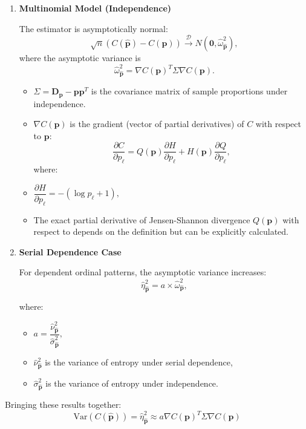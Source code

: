 \documentclass[12pt,a4paper]{article}
\begin{document}
\begin{enumerate}
	\item \textbf{Multinomial Model (Independence)}
	
	The estimator is asymptotically normal:
	$$ \sqrt{n}(C(\widehat{\mathbf{p}})-C(\mathbf{p})) \xrightarrow{\mathscr{D}} N(\mathbf{0}, \widehat{\omega}^2_{\widehat{\mathbf{p}}}),$$
	where the asymptotic variance is 
	$$\widehat{\omega}^2_{\widehat{\mathbf{p}}}= \nabla C(\mathbf{p})^T \Sigma \nabla C(\mathbf{p}).$$
	
	\begin{itemize}
		\item $\Sigma =\mathbf{D_p}-\mathbf{p}\mathbf{p}^T$ is the covariance matrix of sample proportions under independence. 
		\item $\nabla C(\mathbf{p})$ is the gradient (vector of partial derivatives) of $C$ with respect to $\mathbf{p}:$
		$$\dfrac{\partial C}{\partial p_\ell}=Q(\mathbf{p})\dfrac{\partial H}{\partial p_\ell}+H(\mathbf{p})\dfrac{\partial Q}{\partial p_\ell},$$
		where: 
		
		\item $\dfrac{\partial H}{\partial p_\ell}=-(\log p_\ell +1),$ 
		\item The exact partial derivative of Jensen-Shannon divergence $Q(\mathbf{p})$ with respect to depends on the definition but can be explicitly calculated.
	\end{itemize}
	
	
	\item \textbf{Serial Dependence Case} 
	
	For dependent ordinal patterns, the asymptotic variance increases: 
	$$\widehat{\eta}^2_{\widehat{\mathbf{p}}} = a \times \widehat{\omega}^2_{\widehat{\mathbf{p}}},$$
	
	where:
	\begin{itemize}
		\item 
		$a = \dfrac{\widehat{\nu}^2_{\widehat{\mathbf{p}}}}{\widehat{\sigma}^2_{\widehat{\mathbf{p}}}},$ 
		\item  $\widehat{\nu}^2_{\widehat{\mathbf{p}}}$ is the variance of entropy under serial dependence,
		\item $\widehat{\sigma}^2_{\widehat{\mathbf{p}}}$ is the variance of entropy under independence.
	\end{itemize}
	
\end{enumerate}
Bringing these results together:
\[ \text{Var}(C(\widehat{\mathbf{p}})) = \widehat{\eta}^2_{\widehat{\mathbf{p}}} \approx a \nabla C(\mathbf{{p}})^T \Sigma \nabla C(\mathbf{{p}})
\]
\end{document}
